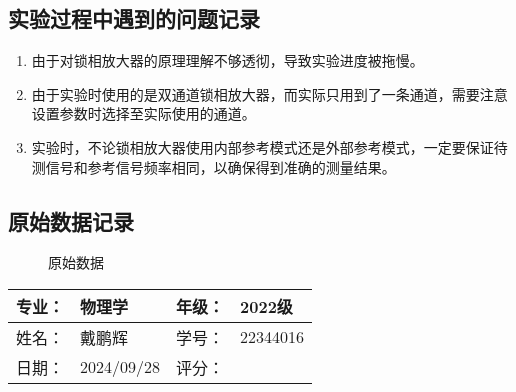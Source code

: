 \documentclass[dvipsnames, svgnames,a4paper,11pt]{article}
\begin{document}




\subsection{实验过程中遇到的问题记录}

\begin{enumerate}
	\item 由于对锁相放大器的原理理解不够透彻，导致实验进度被拖慢。
	\item 由于实验时使用的是双通道锁相放大器，而实际只用到了一条通道，需要注意设置参数时选择至实际使用的通道。
	\item 实验时，不论锁相放大器使用内部参考模式还是外部参考模式，一定要保证待测信号和参考信号频率相同，以确保得到准确的测量结果。
	
\end{enumerate}


\clearpage
\subsection{原始数据记录}

	\begin{figure}[htbp]
		\centering
		\quad
		\quad


		\caption{原始数据}
		\label{fig:data}
	\end{figure}
	

\clearpage
\begin{table}
	\renewcommand\arraystretch{1.7}
	\begin{tabularx}{\textwidth}{|X|X|X|X|}
	\hline
	专业：& 物理学 &年级：& 2022级\\
	\hline
	姓名： & 戴鹏辉 & 学号：& 22344016\\
	\hline
    日期：& 2024/09/28 & 评分： &\\
	\hline
	\end{tabularx}
\end{table}
\end{document}

